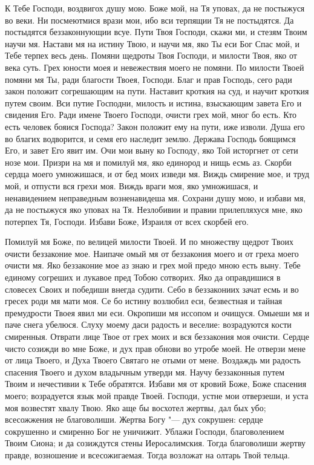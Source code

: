 \begin{mymulticols}
К Тебе Господи, воздвигох душу мою. Боже мой, на Тя уповах, да не постыжуся во веки. Ни посмеютмися врази мои, ибо вси терпящии Тя не постыдятся. Да постыдятся беззаконнующии всуе. Пути Твоя Господи, скажи ми, и стезям Твоим научи мя. Настави мя на истину Твою, и научи мя, яко Ты еси Бог Спас мой, и Тебе терпех весь день. Помяни щедроты Твоя Господи, и милости Твоя, яко от века суть. Грех юности моея и невежествия моего не помяни. По милости Твоей помяни мя Ты, ради благости Твоея, Господи. Благ и прав Господь, сего ради закон положит согрешающим на пути. Наставит кроткия на суд, и научит кроткия путем своим. Вси путие Господни, милость и истина, взыскающим завета Его и свидения Его. Ради имене Твоего Господи, очисти грех мой, мног бо есть. Кто есть человек бояися Господа? Закон положит ему на пути, иже изволи. Душа его во благих водворится, и семя его наследит землю. Держава Господь боящимся Его, и завет Его явит им. Очи мои выну ко Господу, яко Той исторгнет от сети нозе мои. Призри на мя и помилуй мя, яко единород и нищь есмь аз. Скорби сердца моего умножишася, и от бед моих изведи мя. Виждь смирение мое, и труд мой, и отпусти вся грехи моя. Виждь враги моя, яко умножишася, и ненавидением неправедным возненавидеша мя. Сохрани душу мою, и избави мя, да не постыжуся яко уповах на Тя. Незлобивии и правии прилепляхуся мне, яко потерпех Тя, Господи. Избави Боже, Израиля от всех скорбей его. 




Помилуй мя Боже, по велицей милости Твоей. И по множеству щедрот Твоих очисти беззаконие мое. Наипаче омый мя от беззакония моего и от греха моего очисти мя. Яко беззаконие мое аз знаю и грех мой предо мною есть выну. Тебе единому согреших и лукавое пред Тобою сотворих. Яко да оправдишися в словесех Своих и победиши внегда судити. Себо в беззакониих зачат есмь и во гресех роди мя мати моя. Се бо истину возлюбил еси, безвестная и тайная премудрости Твоея явил ми еси. Окропиши мя иссопом и очищуся. Омыеши мя и паче снега убелюся. Слуху моему даси радость и веселие: возрадуются кости смиренныя. Отврати лице Твое от грех моих и вся беззакония моя очисти. Сердце чисто созижди во мне Боже, и дух прав обнови во утробе моей. Не отверзи мене от лица Твоего, и Духа Твоего Святаго не отыми от мене. Воздаждь ми радость спасения Твоего и духом владычным утверди мя. Научу беззаконныя путем Твоим и нечестивии к Тебе обратятся. Избави мя от кровий Боже, Боже спасения моего; возрадуется язык мой правде Твоей. Господи, устне мои отверзеши, и уста моя возвестят хвалу Твою. Яко аще бы восхотел жертвы, дал бых убо; всесожжения не благоволиши. Жертва Богу "--- дух сокрушен: сердце сокрушенно и смиренно Бог не уничижит. Ублажи Господи, благоволением Твоим Сиона; и да созиждутся стены Иеросалимския. Тогда благоволиши жертву правде, возношение и всесожигаемая. Тогда возложат на олтарь Твой тельца.


\end{mymulticols}
